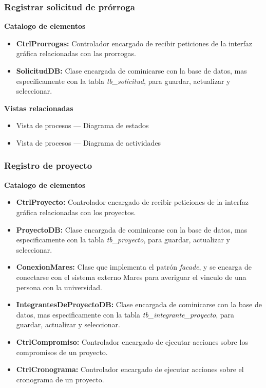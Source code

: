 \documentclass[12pt,oneside,letterpaper]{report}
\begin{document}
\subsubsection{Registrar solicitud de prórroga}


\textbf{Catalogo de elementos}

\begin{itemize}
 \item \textbf{CtrlProrrogas:} Controlador encargado de recibir peticiones de la interfaz gráfica relacionadas con las prorrogas.
 \item \textbf{SolicitudDB:} Clase encargada de cominicarse con la base de datos, mas específicamente con la tabla \textit{tb\_solicitud}, para guardar, actualizar y seleccionar.
\end{itemize}


\textbf{Vistas relacionadas}
\begin{itemize}
 \item Vista de procesos --- Diagrama de estados
 \item Vista de procesos --- Diagrama de actividades
\end{itemize}

\subsubsection{Registro de proyecto}


\textbf{Catalogo de elementos}

\begin{itemize}
 \item \textbf{CtrlProyecto:} Controlador encargado de recibir peticiones de la interfaz gráfica relacionadas con los proyectos.
 \item \textbf{ProyectoDB:} Clase encargada de cominicarse con la base de datos, mas especificamente con la tabla \textit{tb\_proyecto}, para guardar, actualizar y seleccionar.
 \item \textbf{ConexionMares:} Clase que implementa el patrón \textit{facade}, y se encarga de conectarse con el sistema externo Mares para averiguar el vinculo de una persona con la universidad.
 \item \textbf{IntegrantesDeProyectoDB:} Clase encargada de cominicarse con la base de datos, mas especificamente con la tabla \textit{tb\_integrante\_proyecto}, para guardar, actualizar y seleccionar.
 \item \textbf{CtrlCompromiso:} Controlador encargado de ejecutar acciones sobre los compromisos de un proyecto.
 \item \textbf{CtrlCronograma:} Controlador encargado de ejecutar acciones sobre el cronograma de un proyecto.
\end{itemize}
\end{document}
